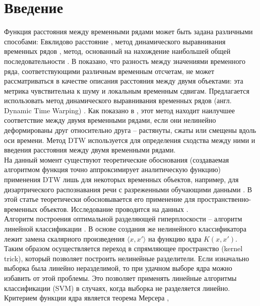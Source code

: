 \documentclass[12pt, twoside]{article}
\begin{document}
\section{Введение}
{Функция расстояния между временными рядами может быть задана различными
способами: Евклидово расстояние \cite{Evklid}, метод динамического выравнивания временных
рядов \cite{DTW1, DTW2}, метод, основанный на нахождение наибольшей общей последовательности \cite{MaxSequence}.
В \cite{Noise} показано, что разность между значениями временного ряда, соответствующими различным временным отсчетам, не может рассматриваться в качестве описания расстояния между двумя объектами: эта метрика чувствительна к
шуму и локальным временным сдвигам. Предлагается использовать метод динамического выравнивания временных рядов (англ. Dynamic Time
Warping) \cite{DTW}. Как показано в \cite{Thebestmethod}, этот метод находит наилучшее соответствие между
двумя временными рядами, если они нелинейно деформированы друг относительно
друга -- растянуты, сжаты или смещены вдоль оси времени. Метод DTW используется для определения сходства между ними и введения расстояния между двумя временными рядами.\\

На данный момент существуют теоретические обоснования (создаваемая алгоритмом функция точно аппроксимирует аналитическую функцию) применения DTW лишь для некоторых временных объектов, например, для дизартрического распознавания речи с разреженными обучающими данными \cite{DisartreSpeech}. В этой статье теоретически обосновывается его применение для пространственно-временных объектов. Исследование проводится на данных \cite{Data}.\\


Алгоритм построения оптимальной разделяющей гиперплоскости -- алгоритм линейной классификации \cite{SVM_Bennett}. В основе создания же нелинейного классификатора лежит замена скалярного произведения $\langle x, x' \rangle$ на функцию ядра $K(x, x')$. Таким образом осуществляется переход в спрямляющее пространство (kernel trick), который позволяет построить нелинейные разделители. Если изначально выборка была линейно неразделимой, то при удачном выборе ядра можно избавить от этой проблемы. Это позволяет применять линейные алгоритмы классификации (SVM) в случаях, когда выборка не разделяется линейно. Критерием функции ядра является теорема Мерсера \cite{Mercer},\\




}
\end{document}
